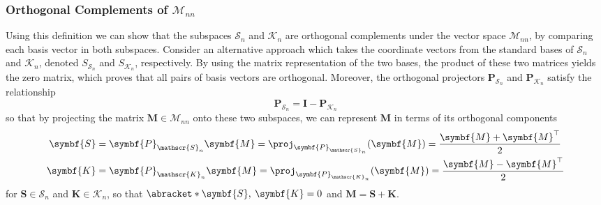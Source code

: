 \documentclass{article}
\begin{document}
\subsubsection{Orthogonal Complements of \texorpdfstring{\(\mathscr{M}_{nn}\)}{Mnn}}
Using this definition we can show that the subspaces \(\mathscr{S}_n\) and \(\mathscr{K}_n\) are orthogonal complements under the vector space
\(\mathscr{M}_{nn}\), by comparing each basis vector in both subspaces.
Consider an alternative approach which takes the coordinate vectors
from the standard bases of \(\mathscr{S}_n\) and \(\mathscr{K}_n\),
denoted \(S_{\mathscr{S}_n}\) and \(S_{\mathscr{K}_n}\), respectively.
By using the matrix representation of the two bases, the product of
these two matrices yields the zero matrix, which proves that all pairs
of basis vectors are orthogonal.
Moreover, the orthogonal projectors \(\symbf{P}_{\mathscr{S}_n}\) and
\(\symbf{P}_{\mathscr{K}_n}\) satisfy the relationship
\begin{equation*}
    \symbf{P}_{\mathscr{S}_n} = \symbf{I} - \symbf{P}_{\mathscr{K}_n}
\end{equation*}
so that by projecting the matrix \(\symbf{M} \in \mathscr{M}_{nn}\) onto these two subspaces, we can represent \(\symbf{M}\) in terms of
its orthogonal components
\begin{align*}
    \symbf{S} & = \symbf{P}_{\mathscr{S}_n} \symbf{M} = \proj_{\symbf{P}_{\mathscr{S}_n}}{\left( \symbf{M} \right)} = \frac{\symbf{M} + \symbf{M}^\top}{2} \\
    \symbf{K} & = \symbf{P}_{\mathscr{K}_n} \symbf{M} = \proj_{\symbf{P}_{\mathscr{K}_n}}{\left( \symbf{M} \right)} = \frac{\symbf{M} - \symbf{M}^\top}{2}
\end{align*}
for \(\symbf{S} \in \mathscr{S}_n\) and \(\symbf{K} \in \mathscr{K}_n\), so that \(\abracket*{\symbf{S},\: \symbf{K}} = 0\) and \(\symbf{M} = \symbf{S} + \symbf{K}\).
\end{document}
